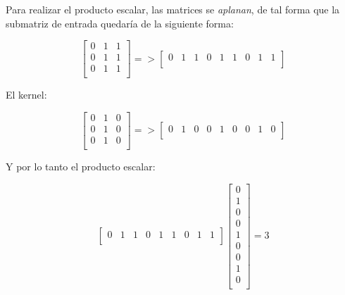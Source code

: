 Para realizar el producto escalar, las matrices se \textit{aplanan}, de tal forma que la submatriz de entrada quedaría de la siguiente forma:

\begin{equation}
	\left[
	\begin{array}{ccc}
		0 & 1 & 1 \\
		0 & 1 & 1 \\
		0 & 1 & 1 \\
	\end{array}
	\right]
	=>
	\left[
	\begin{array}{ccccccccc}
		0 & 1 & 1 & 0 & 1 & 1 & 0 & 1 & 1 \\
	\end{array}
	\right]
	\nonumber
\end{equation}

El kernel:

\begin{equation}
	\left[
	\begin{array}{ccc}
		0 & 1 & 0 \\
		0 & 1 & 0 \\
		0 & 1 & 0 \\
	\end{array}
	\right]
	=>
	\left[
	\begin{array}{ccccccccc}
		0 & 1 & 0 & 0 & 1 & 0 & 0 & 1 & 0 \\
	\end{array}
	\right]
	\nonumber
\end{equation}

Y por lo tanto el producto escalar:

\begin{equation}
	\left[
	\begin{array}{ccccccccc}
		0 & 1 & 1 & 0 & 1 & 1 & 0 & 1 & 1 \\
	\end{array}
	\right]
	\left[
	\begin{array}{c}
		0 \\
		1 \\
		0 \\
		0 \\
		1 \\
		0 \\
		0 \\
		1 \\
		0 \\
	\end{array}
	\right] = 3
	\nonumber
\end{equation}

